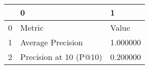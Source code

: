 \begin{tabular}{lll}
\toprule
 & 0 & 1 \\
\midrule
0 & Metric & Value \\
1 & Average Precision & 1.000000 \\
2 & Precision at 10 (P@10) & 0.200000 \\
\bottomrule
\end{tabular}
